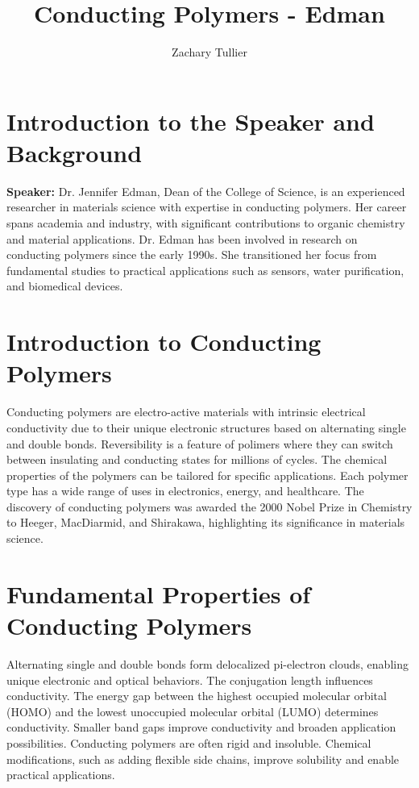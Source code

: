 \documentclass[12pt]{article}
\begin{document}
\singlespacing  %
\title{Conducting Polymers - Edman}

\author[1]{Zachary Tullier}
\date{}
\maketitle

\section{Introduction to the Speaker and Background}
    \textbf{Speaker:} Dr. Jennifer Edman, Dean of the College of Science, is an experienced researcher in materials science with expertise in conducting polymers. Her career spans academia and industry, with significant contributions to organic chemistry and material applications. Dr. Edman has been involved in research on conducting polymers since the early 1990s. She transitioned her focus from fundamental studies to practical applications such as sensors, water purification, and biomedical devices.


\section{Introduction to Conducting Polymers}
    Conducting polymers are electro-active materials with intrinsic electrical conductivity due to their unique electronic structures based on alternating single and double bonds. Reversibility is a feature of polimers where they can switch between insulating and conducting states for millions of cycles.
    The chemical properties of the polymers can be tailored for specific applications. Each polymer type has a wide range of uses in electronics, energy, and healthcare. The discovery of conducting polymers was awarded the 2000 Nobel Prize in Chemistry to Heeger, MacDiarmid, and Shirakawa, highlighting its significance in materials science.

\section{Fundamental Properties of Conducting Polymers}
    Alternating single and double bonds form delocalized pi-electron clouds, enabling unique electronic and optical behaviors. The conjugation length influences conductivity. The energy gap between the highest occupied molecular orbital (HOMO) and the lowest unoccupied molecular orbital (LUMO) determines conductivity. Smaller band gaps improve conductivity and broaden application possibilities. Conducting polymers are often rigid and insoluble. Chemical modifications, such as adding flexible side chains, improve solubility and enable practical applications.
\end{document}
